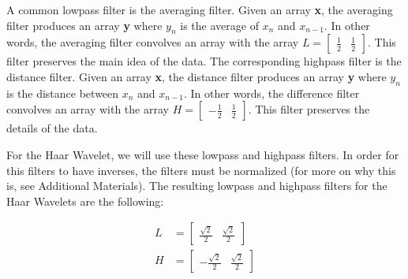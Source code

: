 A common lowpass filter is the averaging filter.
Given an array \textbf{x}, the averaging filter produces an array \textbf{y} where $y_n$ is the average of $x_n$ and $x_{n-1}$.
In other words, the averaging filter convolves an array with the array $L=\begin{bmatrix}\frac{1}{2} & \frac{1}{2}\end{bmatrix}$.
This filter preserves the main idea of the data.
The corresponding highpass filter is the distance filter.
Given an array \textbf{x}, the distance filter produces an array \textbf{y} where $y_n$ is the distance between $x_n$ and $x_{n-1}$.
In other words, the difference filter convolves an array with the array $H=\begin{bmatrix}-\frac{1}{2}&\frac{1}{2}\end{bmatrix}$.
This filter preserves the details of the data.

For the Haar Wavelet, we will use these lowpass and highpass filters.
In order for this filters to have inverses, the filters must be normalized (for more on why this is, see Additional Materials).
The resulting lowpass and highpass filters for the Haar Wavelets are the following:
\begin{comment}
\begin{align*}
H &= \sqrt{2}\begin{bmatrix}\frac{1}{2} & \frac{1}{2}\\-\frac{1}{2} & \frac{1}{2}\end{bmatrix}\\
\end{align*}

For the Haar Wavelet, the matrix $H$ represents the Haar transform.
Each row of the transform represents an array which, when convolved with a vector, produces certain approximation and detail coefficients.
The first row of the Haar transform corresponds to the low-pass filter for the Haar wavelet, and the second row corresponds to the high-pass filter.
To fulfill all necessary properties when dealing with wavelets, the columns are orthonormal.
For more on the Haar Wavelet Transform, see Additional Materials.
\end{comment}
\begin{align*}
L &= \begin{bmatrix}\frac{\sqrt{2}}{2} & \frac{\sqrt{2}}{2}\end{bmatrix}\\H &=\begin{bmatrix}-\frac{\sqrt{2}}{2} & \frac{\sqrt{2}}{2}\end{bmatrix}\\
\end{align*}

